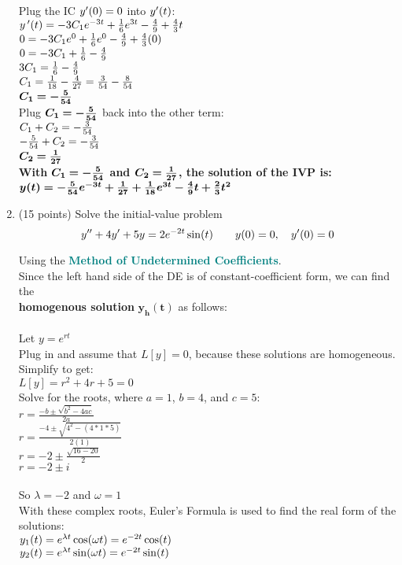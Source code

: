 \documentclass{article}
\begin{document}
\begin{enumerate}
Plug the IC $y\sp\prime(0)=0$ into $y\sp\prime(t)$:\\
$y\,\sp\prime(t) = -3C_1e\sp{-3t} + {1\over6}e\sp{3t} -{4\over9} + {4\over3}t$\\
$0 = -3C_1e\sp{0} + {1\over6}e\sp{0} -{4\over9} + {4\over3}(0)$\\
$0 = -3C_1 + {1\over6} -{4\over9}$\\
$3C_1 = {1\over6} - {4\over9}$\\
$C_1 = {1\over18} - {4\over27} = {3\over54} - {8\over54} $\\
$\bm{C_1 = -{5\over54}}$\\

Plug $\bm{C_1 = -{5\over54}}$ back into the other term:\\
$C_1 + C_2 = -{3\over54}$\\
$-{5\over54} + C_2 = -{3\over54}$\\
$\bm{C_2 = {1\over27}}$\\

\textbf{With $\bm{C_1 = -{5\over54}}$ and $\bm{C_2= {1\over27}}$, the solution of the IVP is:}\\
$\bm{y(t) = -{5\over54}e\sp{-3t} + {1\over27} + {1\over18}e\sp{3t}-{4\over9}t + {2\over3}t^2}$\\

\newpage
\item (15 points) Solve the initial-value problem
\[
y\sp{\prime\prime}+4y\sp{\prime}+5y=2e\sp{-2t}\sin(t)\qquad y(0)=0,\quad y\sp\prime(0)=0
\]

Using the \textcolor{teal}{\textbf{Method of Undetermined Coefficients}}.\\
Since the left hand side of the DE is of constant-coefficient form, we can find the\\ \textbf{homogenous solution} $\bm{y_h(t)}$ as follows:\\\\
Let $y = e^{rt}$\\
Plug in and assume that $L[y]=0$, because these solutions are homogeneous. Simplify to get:\\
$L[y] = r^2 + 4r + 5 = 0$\\
Solve for the roots, where $a=1$, $b=4$, and $c=5$:\\
$r=\frac{-b\pm\sqrt{b^2-4ac}}{2a}$\\
$r=\frac{-4\pm\sqrt{4^2-(4*1*5)}}{2(1)}$\\
$r=-2\pm\frac{\sqrt{16-20}}{2}$\\
$r=-2\pm i$\\\\
So $\lambda = -2$ and $\omega = 1$\\
With these complex roots, Euler's Formula is used to find the real form of the solutions:\\
$y_1(t)=e\sp{\lambda t}\cos(\omega t) = e\sp{-2t}\cos(t)$\\
$y_2(t)=e\sp{\lambda t}\sin(\omega t) = e\sp{-2t}\sin(t)$\\


\end{enumerate}
\end{document}
